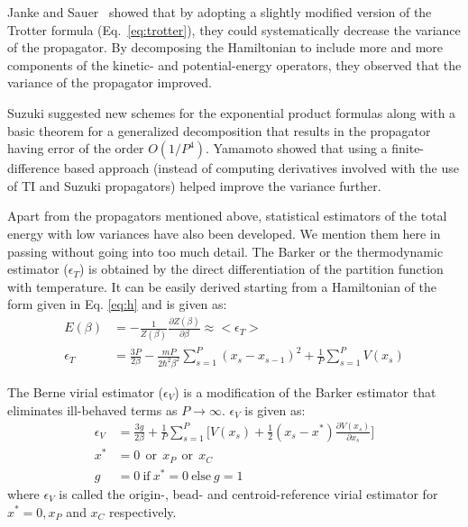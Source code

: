         Janke and Sauer~\cite{Janke1992} showed that by adopting a slightly modified version of the Trotter formula (Eq.~\eqref{eq:trotter}), they could systematically decrease the variance of the propagator. By decomposing the Hamiltonian to include more and more components of the kinetic- and potential-energy operators, they observed that the variance of the propagator improved.

        Suzuki \cite{Suzuki1995} suggested new schemes for the exponential product formulas along with a basic theorem for a generalized decomposition that results in the propagator having error of the order $O(1/P^4)$. Yamamoto \cite{Yamamoto2005} showed that using a finite-difference based approach (instead of computing derivatives involved with the use of TI and Suzuki propagators) helped improve the variance further.

        Apart from the propagators mentioned above, statistical estimators of the total energy with low variances have also been developed. We mention them here in passing without going into too much detail. The Barker or the thermodynamic estimator\cite{Barker1979} ($\epsilon_T$) is obtained by the direct differentiation of the partition function with temperature. It can be easily derived starting from a Hamiltonian of the form given in Eq. \eqref{eq:h} and is given as:
        \begin{equation}\label{eT}
            \begin{aligned}
                E(\beta) &= - \displaystyle\frac{1}{Z(\beta)} \frac{\partial Z(\beta)}{\partial \beta} \approx <\epsilon_T>\\
                \epsilon_T &= \displaystyle\frac{3P}{2\beta} - \frac{mP}{2\hbar^2 \beta^2} \sum\limits_{s=1}^P (x_s - x_{s-1})^2 + \frac{1}{P} \sum\limits_{s=1}^P V(x_s)
            \end{aligned}
        \end{equation}

        The Berne virial estimator\cite{Cao1989} ($\epsilon_V$) is a modification of the Barker estimator that eliminates ill-behaved terms  as $P \to \infty$. $\epsilon_V$ is given as:
        \begin{equation}\label{eV}
            \begin{aligned}
                \epsilon_V &= \displaystyle\frac{3g}{2\beta} + \frac{1}{P} \sum\limits_{s=1}^P \bigg[ V(x_s) + \frac{1}{2} (x_s - x^*) \frac{\partial V(x_s)}{\partial x_s} \bigg]\\
                x^* &= 0\: \: \text{or}\:\: x_P \: \:\text{or} \:\: x_C\\
                g &= 0 ~\text{if}~ x^* = 0~ \text{else}~ g = 1
            \end{aligned}
        \end{equation}
        where $\epsilon_V$ is called the origin-, bead- and centroid-reference virial estimator for $x^* = 0, x_P$ and $x_C$ respectively.


